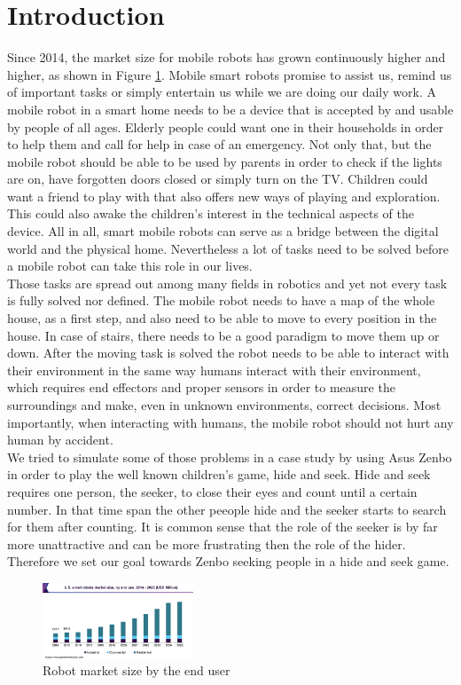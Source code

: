 \documentclass[conference]{IEEEtran}
\begin{document}
\section{Introduction}
Since 2014, the market size for mobile robots has grown continuously higher and higher, as shown in Figure \ref{fig:robotmarket}.
Mobile smart robots promise to assist us, remind us of important tasks or simply entertain us while we are doing our daily work.
A mobile robot in a smart home needs to be a device that is accepted by and usable by people of all ages.
Elderly people could want one in their households in order to help them and call for help in case of an emergency.
Not only that, but the mobile robot should be able to be used by parents in order to check if the lights are on, have forgotten doors closed
or simply turn on the TV. 
Children could want a friend to play with that also offers new ways of playing and exploration. 
This could also awake the children's interest in the technical aspects of the device. 
All in all, smart mobile robots can serve as a bridge between the digital world and the physical home.
Nevertheless a lot of tasks need to be solved before a mobile robot can take this role in our lives.\\
Those tasks are spread out among many fields in robotics and yet not every task is fully solved nor defined. 
The mobile robot needs to have a map of the whole house, as a first step, and also need to be able to move to every position in the house.
In case of stairs, there needs to be a good paradigm to move them up or down.
After the moving task is solved the robot needs to be able to interact with their environment in the same way humans interact with their environment, 
which requires end effectors and proper sensors in order to measure the surroundings and make, even in unknown environments, correct decisions.
Most importantly, when interacting with humans, the mobile robot should not hurt any human by accident.\\
We tried to simulate some of those problems in a case study by using Asus Zenbo in order to play the well known children's game, hide and seek.
Hide and seek requires one person, the seeker, to close their eyes and count until a certain number. 
In that time span the other peeople hide and the seeker starts to search
for them after counting. It is common sense that the role of the seeker is by far more unattractive and can be more frustrating
then the role of the hider. Therefore we set our goal towards Zenbo seeking people in a hide and seek game. \\
\begin{figure}[h]  \label{fig:robotmarket}
	\begin{center}
		\includegraphics[width=0.4\textwidth]{pics/robotMarket.png}
	\end{center}
	\caption{Robot market size by the end user \cite{b0}}
\end{figure}\\\\
\end{document}
